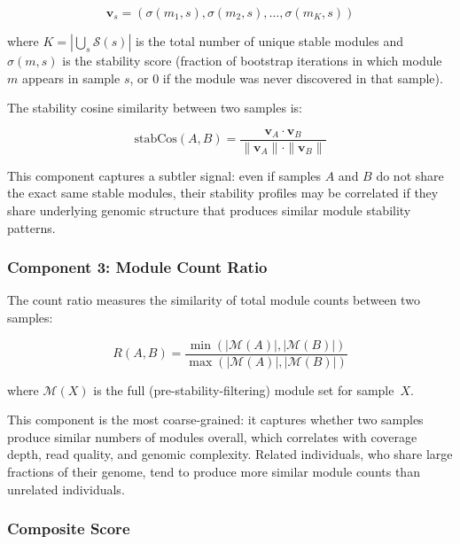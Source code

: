 \documentclass{../yalumba}
\begin{document}
\begin{equation}
  \mathbf{v}_s = (\sigma(m_1, s), \sigma(m_2, s), \ldots, \sigma(m_K, s))
  \label{eq:stability-vector}
\end{equation}

where $K = |\bigcup_s \mathcal{S}(s)|$ is the total number of unique stable
modules and $\sigma(m, s)$ is the stability score (fraction of bootstrap
iterations in which module $m$ appears in sample $s$, or 0 if the module was
never discovered in that sample).

The stability cosine similarity between two samples is:

\begin{equation}
  \text{stabCos}(A, B) = \frac{\mathbf{v}_A \cdot \mathbf{v}_B}
  {\|\mathbf{v}_A\| \cdot \|\mathbf{v}_B\|}
  \label{eq:stab-cosine}
\end{equation}


This component captures a subtler signal: even if samples $A$ and $B$ do not
share the exact same stable modules, their stability profiles may be correlated
if they share underlying genomic structure that produces similar module
stability patterns.

\subsubsection{Component 3: Module Count Ratio}

The count ratio measures the similarity of total module counts between two
samples:

\begin{equation}
  R(A, B) = \frac{\min(|\mathcal{M}(A)|, |\mathcal{M}(B)|)}
                  {\max(|\mathcal{M}(A)|, |\mathcal{M}(B)|)}
  \label{eq:count-ratio}
\end{equation}

where $\mathcal{M}(X)$ is the full (pre-stability-filtering) module set for
sample~$X$.

This component is the most coarse-grained: it captures whether two samples
produce similar numbers of modules overall, which correlates with coverage
depth, read quality, and genomic complexity.  Related individuals, who share
large fractions of their genome, tend to produce more similar module counts
than unrelated individuals.

\subsubsection{Composite Score}
\end{document}
